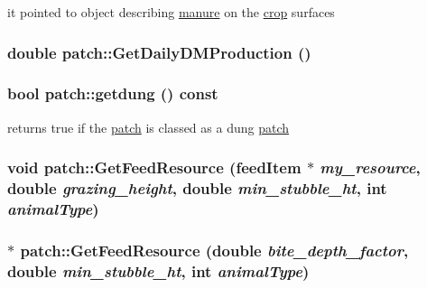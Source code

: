 it pointed to object describing \hyperlink{classmanure}{manure} on the \hyperlink{classcrop}{crop} surfaces \hypertarget{classpatch_a334f1d4bec7e4b63de7f008255b10904}{
\subsubsection[{GetDailyDMProduction}]{\setlength{\rightskip}{0pt plus 5cm}double patch::GetDailyDMProduction ()}}
\label{classpatch_a334f1d4bec7e4b63de7f008255b10904}
\hypertarget{classpatch_a279fb0c6870f98e0f391bb045a20628d}{
\subsubsection[{getdung}]{\setlength{\rightskip}{0pt plus 5cm}bool patch::getdung () const}}
\label{classpatch_a279fb0c6870f98e0f391bb045a20628d}


returns true if the \hyperlink{classpatch}{patch} is classed as a dung \hyperlink{classpatch}{patch} \hypertarget{classpatch_a5a5c69eaf98d19b29f47e1a201901c7d}{
\subsubsection[{GetFeedResource}]{\setlength{\rightskip}{0pt plus 5cm}void patch::GetFeedResource ({\bf feedItem} $\ast$ {\em my\_\-resource}, \/  double {\em grazing\_\-height}, \/  double {\em min\_\-stubble\_\-ht}, \/  int {\em animalType})}}
\label{classpatch_a5a5c69eaf98d19b29f47e1a201901c7d}
\hypertarget{classpatch_a2b8f90d5a3bb56be406d4225d477d8a5}{
\subsubsection[{GetFeedResource}]{ $\ast$ patch::GetFeedResource (double {\em bite\_\-depth\_\-factor}, \/  double {\em min\_\-stubble\_\-ht}, \/  int {\em animalType})}}
\label{classpatch_a2b8f90d5a3bb56be406d4225d477d8a5}


